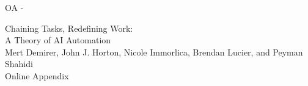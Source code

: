\documentclass[12pt, final]{article}
\begin{document}
%
%
\newcommand{\startappendixpart}[3][]{%
  \clearpage
  \gdef\thesection{#2.\Alph{section}}%
  \gdef\theHsection{#2.\Alph{section}}%
  \expandafter\gdef\csname thepage\endcsname{#2 - \arabic{page}}%
  \setcounter{section}{0}%
  \setcounter{figure}{0}\setcounter{table}{0}\setcounter{equation}{0}%
  \setcounter{definition}{0}\setcounter{lemma}{0}\setcounter{assumption}{0}%
  \setcounter{constraint}{0}\setcounter{proposition}{0}\setcounter{corollary}{0}%
  \setcounter{theorem}{0}\setcounter{observation}{0}\setcounter{example}{0}%
  \setcounter{page}{1}%
  \pagestyle{empty}%
  \begin{center}
    {\LARGE Chaining Tasks, Redefining Work: \\ A Theory of AI Automation}\\[0.7em]
    \large Mert Demirer, John J. Horton, Nicole Immorlica, Brendan Lucier, and Peyman Shahidi \\[0.7em]
    {\LARGE #3}\\[0.6em]
    \if\relax\detokenize{#1}\relax\else{\large (#1)}\\[0.6em]\fi
  \end{center}
}


\startappendixpart{OA}{Online Appendix}
\makeatletter
\let\OA@normalsize\normalsize
\renewcommand\normalsize{\OA@normalsize
  \setlength\abovedisplayskip{7pt}\setlength\belowdisplayskip{7pt}%
  \setlength\abovedisplayshortskip{7pt}\setlength\belowdisplayshortskip{7pt}}
\makeatother
\normalsize
\gdef\thesection{\Alph{section}}
\end{document}
